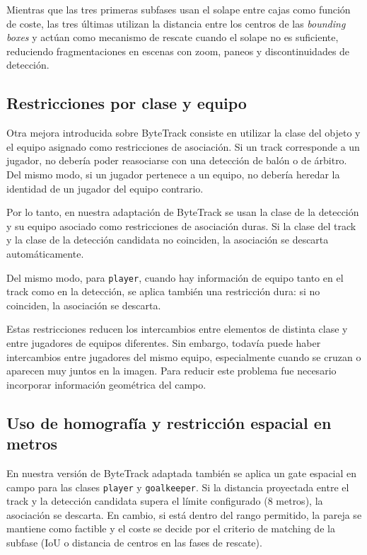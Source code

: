 Mientras que las tres primeras subfases usan el solape entre cajas como función de coste, las tres últimas utilizan la distancia entre los centros de las \textit{bounding boxes} y actúan como mecanismo de rescate cuando el solape no es suficiente, reduciendo fragmentaciones en escenas con zoom, paneos y discontinuidades de detección.

\subsection{Restricciones por clase y equipo}

Otra mejora introducida sobre ByteTrack consiste en utilizar la clase del objeto y el equipo asignado como restricciones de asociación. Si un track corresponde a un jugador, no debería poder reasociarse con una detección de balón o de árbitro. Del mismo modo, si un jugador pertenece a un equipo, no debería heredar la identidad de un jugador del equipo contrario.

Por lo tanto, en nuestra adaptación de ByteTrack se usan la clase de la detección y su equipo asociado como restricciones de asociación duras. Si la clase del track y la clase de la detección candidata no coinciden, la asociación se descarta automáticamente.

Del mismo modo, para \texttt{player}, cuando hay información de equipo tanto en el track como en la detección, se aplica también una restricción dura: si no coinciden, la asociación se descarta.

Estas restricciones reducen los intercambios entre elementos de distinta clase y entre jugadores de equipos diferentes. Sin embargo, todavía puede haber intercambios entre jugadores del mismo equipo, especialmente cuando se cruzan o aparecen muy juntos en la imagen. Para reducir este problema fue necesario incorporar información geométrica del campo.

\subsection{Uso de homografía y restricción espacial en metros}

En nuestra versión de ByteTrack adaptada también se aplica un gate espacial en campo para las clases \texttt{player} y \texttt{goalkeeper}. Si la distancia proyectada entre el track y la detección candidata supera el límite configurado (8 metros), la asociación se descarta. En cambio, si está dentro del rango permitido, la pareja se mantiene como factible y el coste se decide por el criterio de matching de la subfase (IoU o distancia de centros en las fases de rescate).

